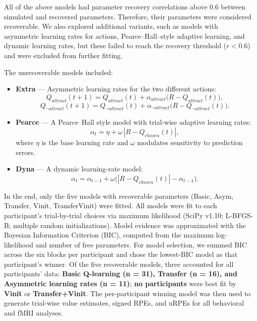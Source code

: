 \documentclass{article}
\begin{document}
All of the above models had parameter recovery correlations above 0.6 between simulated and recovered parameters. Therefore, their parameters were considered recoverable. We also explored additional variants, such as models with asymmetric learning rates for actions, Pearce–Hall–style adaptive learning, and dynamic learning rates, but these failed to reach the recovery threshold ($r < 0.6$) and were excluded from further fitting.

The unrecoverable models included:

\begin{itemize}
    \item \textbf{Extra} — Asymmetric learning rates for the two different actions:
    \[
    Q_{attract}(t+1) = Q_{attract}(t) + \alpha_{attract} \big(R - Q_{attract}(t)\big),
    \]
    \[
    Q_{\neg attract}(t+1) = Q_{\neg attract}(t) + \alpha_{\neg attract} \big(R - Q_{\neg attract}(t)\big).
    \]

    \item \textbf{Pearce} — A Pearce–Hall style model \cite{pearce1980model} with trial-wise adaptive learning rates:
    \[
    \alpha_{t} = \eta + \omega \, |R - Q_{chosen}(t)|,
    \]
    where $\eta$ is the base learning rate and $\omega$ modulates sensitivity to prediction errors.

    \item \textbf{Dyna} — A dynamic learning-rate model:
    \[
    \alpha_{t} = \alpha_{t-1} + \omega \big(|R - Q_{chosen}(t)| - \alpha_{t-1}\big).
    \]
\end{itemize}

In the end, only the five models with recoverable parameters (Basic, Asym, Transfer, Vinit, TransferVinit) were fitted. All models were fit to each participant’s trial-by-trial choices via maximum likelihood (SciPy v1.10; L-BFGS-B; multiple random initializations). Model evidence was approximated with the Bayesian Information Criterion (BIC), computed from the maximum log-likelihood and number of free parameters. For model selection, we summed BIC across the six blocks per participant and chose the lowest-BIC model as that participant’s winner. Of the five recoverable models, three accounted for all participants' data: \textbf{Basic Q-learning (n = 31), Transfer (n = 16), and Asymmetric learning rates (n = 11)}; \textbf{no participants} were best fit by \textbf{Vinit} or \textbf{Transfer+Vinit}. The per-participant winning model was then used to generate trial-wise value estimates, signed RPEs, and uRPEs for all behavioral and fMRI analyses.
\end{document}
